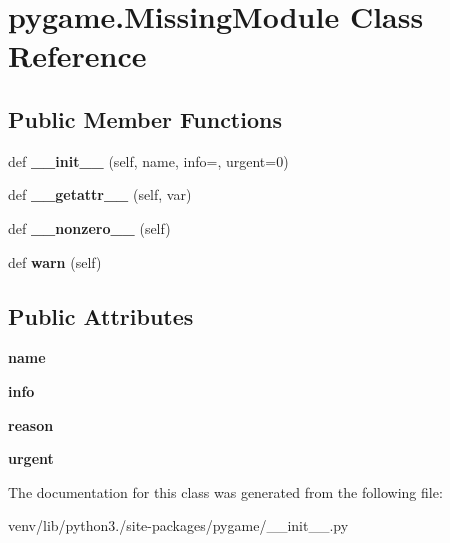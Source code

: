\hypertarget{classpygame_1_1_missing_module}{}\section{pygame.\+Missing\+Module Class Reference}
\label{classpygame_1_1_missing_module}
\subsection*{Public Member Functions}
\begin{DoxyCompactItemize}
\item 
\mbox{\label{classpygame_1_1_missing_module_ac8c8f4e5a943cb6c4fc9c470613d65ea}} 
def {\bfseries \+\_\+\+\_\+init\+\_\+\+\_\+} (self, name, info=\textquotesingle{}\textquotesingle{}, urgent=0)
\item 
\mbox{\label{classpygame_1_1_missing_module_a049154886f2f3db30a6508b61b835f22}} 
def {\bfseries \+\_\+\+\_\+getattr\+\_\+\+\_\+} (self, var)
\item 
\mbox{\label{classpygame_1_1_missing_module_afff57a6876cf69da538c979130bd3907}} 
def {\bfseries \+\_\+\+\_\+nonzero\+\_\+\+\_\+} (self)
\item 
\mbox{\label{classpygame_1_1_missing_module_a749937f87e61ea58e809b81d2890bb3c}} 
def {\bfseries warn} (self)
\end{DoxyCompactItemize}
\subsection*{Public Attributes}
\begin{DoxyCompactItemize}
\item 
\mbox{\label{classpygame_1_1_missing_module_a22aa2de8c0eeee6ca63f4129d61831c6}} 
{\bfseries name}
\item 
\mbox{\label{classpygame_1_1_missing_module_a86898e627073a673d8dff03ea624ba29}} 
{\bfseries info}
\item 
\mbox{\label{classpygame_1_1_missing_module_a548d8b9db9c8f05ae3c29b7188589895}} 
{\bfseries reason}
\item 
\mbox{\label{classpygame_1_1_missing_module_a916bc3cf214161736399ce5aadfec10d}} 
{\bfseries urgent}
\end{DoxyCompactItemize}


The documentation for this class was generated from the following file\+:\begin{DoxyCompactItemize}
\item 
venv/lib/python3./site-\/packages/pygame/\+\_\+\+\_\+init\+\_\+\+\_\+.\+py\end{DoxyCompactItemize}

